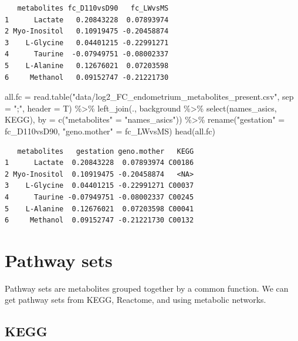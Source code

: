 \documentclass[
  24px,
  letterpaper,
  DIV=11,
  numbers=noendperiod]{scrartcl}
\newenvironment{Shaded}{\begin{snugshade}}{\end{snugshade}}
\newcommand{\AttributeTok}[1]{\textcolor[rgb]{0.40,0.45,0.13}{#1}}
\newcommand{\FunctionTok}[1]{\textcolor[rgb]{0.28,0.35,0.67}{#1}}
\newcommand{\NormalTok}[1]{\textcolor[rgb]{0.00,0.23,0.31}{#1}}
\newcommand{\OtherTok}[1]{\textcolor[rgb]{0.00,0.23,0.31}{#1}}
\newcommand{\SpecialCharTok}[1]{\textcolor[rgb]{0.37,0.37,0.37}{#1}}
\newcommand{\StringTok}[1]{\textcolor[rgb]{0.13,0.47,0.30}{#1}}
\begin{document}
\begin{verbatim}
   metabolites fc_D110vsD90   fc_LWvsMS
1      Lactate   0.20843228  0.07893974
2 Myo-Inositol   0.10919475 -0.20458874
3    L-Glycine   0.04401215 -0.22991271
4      Taurine  -0.07949751 -0.08002337
5    L-Alanine   0.12676021  0.07203598
6     Methanol   0.09152747 -0.21221730
\end{verbatim}

\begin{Shaded}
\begin{Highlighting}[]
\NormalTok{all.fc }\OtherTok{=} \FunctionTok{read.table}\NormalTok{(}\StringTok{"data/log2\_FC\_endometrium\_metabolites\_present.csv"}\NormalTok{, }\AttributeTok{sep =} \StringTok{";"}\NormalTok{, }\AttributeTok{header =}\NormalTok{ T) }\SpecialCharTok{\%\textgreater{}\%} 
  \FunctionTok{left\_join}\NormalTok{(., background }\SpecialCharTok{\%\textgreater{}\%} \FunctionTok{select}\NormalTok{(names\_asics, KEGG), }
            \AttributeTok{by =} \FunctionTok{c}\NormalTok{(}\StringTok{"metabolites"} \OtherTok{=} \StringTok{"names\_asics"}\NormalTok{)) }\SpecialCharTok{\%\textgreater{}\%} 
  \FunctionTok{rename}\NormalTok{(}\StringTok{"gestation"} \OtherTok{=}\NormalTok{ fc\_D110vsD90, }\StringTok{"geno.mother"} \OtherTok{=}\NormalTok{ fc\_LWvsMS)}
\FunctionTok{head}\NormalTok{(all.fc)}
\end{Highlighting}
\end{Shaded}

\begin{verbatim}
   metabolites   gestation geno.mother   KEGG
1      Lactate  0.20843228  0.07893974 C00186
2 Myo-Inositol  0.10919475 -0.20458874   <NA>
3    L-Glycine  0.04401215 -0.22991271 C00037
4      Taurine -0.07949751 -0.08002337 C00245
5    L-Alanine  0.12676021  0.07203598 C00041
6     Methanol  0.09152747 -0.21221730 C00132
\end{verbatim}

\hypertarget{pathway-sets}{%
\section{Pathway sets}\label{pathway-sets}}

Pathway sets are metabolites grouped together by a common function. We
can get pathway sets from KEGG, Reactome, and using metabolic networks.

\hypertarget{kegg}{%
\subsection{KEGG}\label{kegg}}
\end{document}
